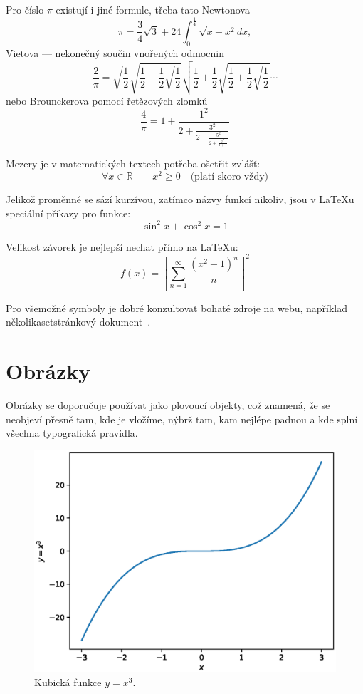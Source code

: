 \documentclass{article}
\begin{document}
	Pro číslo $\pi$ existují i jiné formule, třeba tato Newtonova
	\begin{equation}
		\pi=\frac{3}{4}\sqrt{3}+24\int_{0}^{\frac{1}{4}}\sqrt{x-x^2}dx,
	\end{equation}
	Vietova --- nekonečný součin vnořených odmocnin
	\begin{equation}
		\frac{2}{\pi}=\sqrt{\frac{1}{2}}\sqrt{\frac{1}{2}+\frac{1}{2}\sqrt{\frac{1}{2}}}\sqrt{\frac{1}{2}+\frac{1}{2}\sqrt{\frac{1}{2}+\frac{1}{2}\sqrt{\frac{1}{2}}}}\dotsb
	\end{equation}
	nebo Brounckerova pomocí řetězových zlomků
	\begin{equation}
		\label{eq:Brouncker}
		\frac{4}{\pi}=1+\frac{1^2}{2+\frac{3^2}{2+\frac{5^2}{2+\frac{7^2}{2+\dotsb}}}}
	\end{equation}
	
	Mezery je v matematických textech potřeba ošetřit zvlášť:
	\begin{equation}
		\forall x\in\mathbb{R}\qquad x^{2}\geq0 \quad\textrm{(platí skoro vždy)}
	\end{equation}
	
	Jelikož proměnné se sází kurzívou, zatímco názvy funkcí nikoliv,
	jsou v \LaTeX u speciální příkazy pro funkce:
	\begin{equation}
		\sin^{2}x+\cos^2{x}=1
	\end{equation}
	
	Velikost závorek je nejlepší nechat přímo na \LaTeX u:
	\begin{equation}
		f(x)=\left[\sum_{n=1}^{\infty}\frac{\left(x^2-1\right)^n}{n}\right]^2
	\end{equation}
	
	Pro všemožné symboly je dobré konzultovat bohaté zdroje na webu,
	například několikasetstránkový dokument~\cite{ref:SymbolList}. 
	
	\section{Obrázky}
	Obrázky se doporučuje používat jako plovoucí objekty, což znamená, že se neobjeví přesně tam, kde je vložíme, nýbrž tam, kam nejlépe padnou a kde splní všechna typografická pravidla.
		\begin{figure}[!htbp]
			\centering
			\includegraphics[width=0.8\linewidth]{kubik.eps}
			\caption{Kubická funkce $y=x^3$.}
			\label{fig:bandf}
		\end{figure}	
\end{document}
